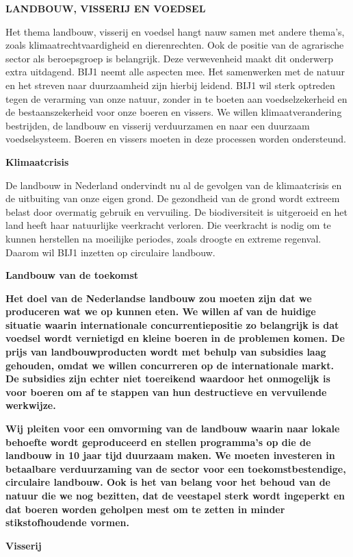 \textbf{LANDBOUW, VISSERIJ EN VOEDSEL}

Het thema landbouw, visserij en voedsel hangt nauw samen met andere
thema's, zoals klimaatrechtvaardigheid en dierenrechten. Ook de positie
van de agrarische sector als beroepsgroep is belangrijk. Deze
verwevenheid maakt dit onderwerp extra uitdagend. BIJ1 neemt alle
aspecten mee. Het samenwerken met de natuur en het streven naar
duurzaamheid zijn hierbij leidend. BIJ1 wil sterk optreden tegen de
verarming van onze natuur, zonder in te boeten aan voedselzekerheid en
de bestaanszekerheid voor onze boeren en vissers. We willen
klimaatverandering bestrijden, de landbouw en visserij verduurzamen en
naar een duurzaam voedselsysteem. Boeren en vissers moeten in deze
processen worden ondersteund.

\textbf{Klimaatcrisis}

De landbouw in Nederland ondervindt nu al de gevolgen van de
klimaatcrisis en de uitbuiting van onze eigen grond. De gezondheid van
de grond wordt extreem belast door overmatig gebruik en vervuiling. De
biodiversiteit is uitgeroeid en het land heeft haar natuurlijke
veerkracht verloren. Die veerkracht is nodig om te kunnen herstellen na
moeilijke periodes, zoals droogte en extreme regenval. Daarom wil BIJ1
inzetten op circulaire landbouw.

\textbf{Landbouw van de toekomst}

\textbf{Het doel van de Nederlandse landbouw zou moeten zijn dat we
produceren wat we op kunnen eten. We willen af van de huidige situatie
waarin internationale concurrentiepositie zo belangrijk is dat voedsel
wordt vernietigd en kleine boeren in de problemen komen. De prijs van
landbouwproducten wordt met behulp van subsidies laag gehouden, omdat we
willen concurreren op de internationale markt. De subsidies zijn echter
niet toereikend waardoor het onmogelijk is voor boeren om af te stappen
van hun destructieve en vervuilende werkwijze.}

\textbf{Wij pleiten voor een omvorming van de landbouw waarin naar
lokale behoefte wordt geproduceerd en stellen programma's op die de
landbouw in 10 jaar tijd duurzaam maken. We moeten investeren in
betaalbare verduurzaming van de sector voor een toekomstbestendige,
circulaire landbouw. Ook is het van belang voor het behoud van de natuur
die we nog bezitten, dat de veestapel sterk wordt ingeperkt en dat
boeren worden geholpen mest om te zetten in minder stikstofhoudende
vormen.}

\textbf{Visserij}

